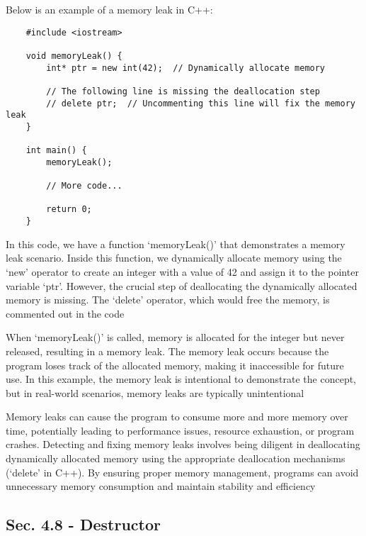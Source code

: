 \begin{solution}
    Below is an example of a memory leak in C++:
    
    \horizontalline
    
    \begin{verbatim}   
    #include <iostream>

    void memoryLeak() {
        int* ptr = new int(42);  // Dynamically allocate memory
    
        // The following line is missing the deallocation step
        // delete ptr;  // Uncommenting this line will fix the memory leak
    }
    
    int main() {
        memoryLeak();
    
        // More code...
    
        return 0;
    }
        \end{verbatim}
    
    \horizontalline

    In this code, we have a function `memoryLeak()' that demonstrates a memory leak scenario. Inside this function, we dynamically allocate memory using the `new' operator to create an integer with a value of 42 and assign it to the pointer variable `ptr'. 
    However, the crucial step of deallocating the dynamically allocated memory is missing. The `delete' operator, which would free the memory, is commented out in the code
    
    When `memoryLeak()' is called, memory is allocated for the integer but never released, resulting in a memory leak. The memory leak occurs because the program loses track of the allocated memory, making it inaccessible for future use. In this example, 
    the memory leak is intentional to demonstrate the concept, but in real-world scenarios, memory leaks are typically unintentional
    
    Memory leaks can cause the program to consume more and more memory over time, potentially leading to performance issues, resource exhaustion, or program crashes. Detecting and fixing memory leaks involves being diligent in deallocating dynamically 
    allocated memory using the appropriate deallocation mechanisms (`delete' in C++). By ensuring proper memory management, programs can avoid unnecessary memory consumption and maintain stability and efficiency
\end{solution}

\subsection*{Sec. 4.8 - Destructor}

